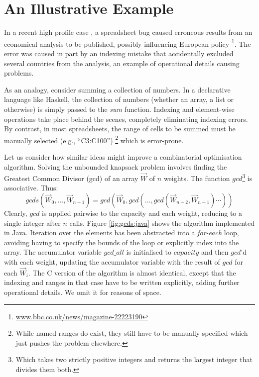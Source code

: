 \section{An Illustrative Example}

In a recent high profile case \cite{Herndon13}, a spreadsheet bug caused
erroneous results from an economical analysis to be published, possibly
influencing European policy%
\footnote{\url{www.bbc.co.uk/news/magazine-22223190}}.
The error was caused in part by an indexing mistake that accidentally excluded
several countries from the analysis, an example of operational details causing
problems.

As an analogy, consider summing a collection of numbers. In a declarative
language like Haskell, the collection of numbers (whether an array, a list or
otherwise) is simply passed to the \emph{sum} function. Indexing and
element-wise operations take place behind the scenes, completely eliminating
indexing errors. By contrast, in most spreadsheets, the range of cells to
be summed must be manually selected (e.g., ``C3:C100'')%
\footnote{While named ranges do exist, they still have to be manually specified
which just pushes the problem elsewhere.} which is error-prone.

Let us consider how similar ideas might improve a combinatorial
optimisation algorithm. Solving the unbounded knapsack problem involves
finding the Greatest Common Divisor (gcd) of an array $\vec{W}$ of $n$
weights. The function $gcd$\footnote{Which takes two strictly positive integers and returns the largest integer that divides them both.}
is associative. Thus:
\[
gcds (\vec{W}_0, \ldots, \vec{W}_{n-1}) =
gcd(\vec{W}_0,gcd(\ldots,gcd (\vec{W}_{n-2},\vec{W}_{n-1})\cdots))
\]
Clearly, $gcd$ is applied pairwise to the capacity and each weight,
reducing to a single integer after $n$ calls. Figure \ref{fig:gcds:java} shows
the algorithm implemented in Java. Iteration over the elements has been
abstracted into a \emph{for-each} loop, avoiding having to specify the bounds
of the loop or explicitly index into the array. The accumulator variable $gcd\_all$ is initialised to
$capacity$ and then $gcd$'d with each weight, updating the accumulator
variable with the result of $gcd$ for each $\vec{W}_i$. The C version of
the algorithm is almost identical, except that the indexing and ranges in that case have
to be written explicitly, adding further operational details. We omit it for
reasons of space.

